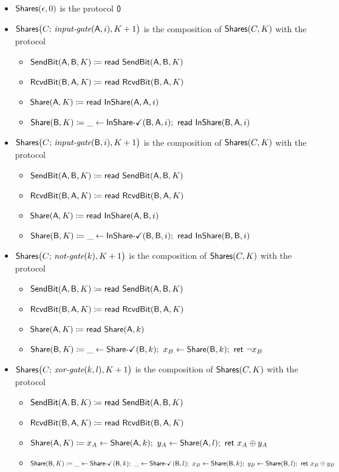 \begin{itemize}
\item $\Shares(\epsilon,0)$ is the protocol $\zero$

\item $\Shares\big(C; \, \inputgate(\A,i),K+1\big)$ is the composition of $\Shares(C,K)$ with the protocol
\begin{itemize}
\item $\SendBit(\A,\B,K) \coloneqq \read{\SendBit(\A,\B,K)}$
\item $\RcvdBit(\B,\A,K) \coloneqq \read{\RcvdBit(\B,\A,K)}$
\item $\Share(\A,K) \coloneqq \read{\InShare(\A,\A,i)}$
\item $\Share(\B,K) \coloneqq \_ \leftarrow \InShareOk(\B,\A,i); \ \read{\InShare(\B,\A,i)}$
\end{itemize}

\item $\Shares\big(C; \, \inputgate(\B,i),K+1\big)$ is the composition of $\Shares(C,K)$ with the protocol
\begin{itemize}
\item $\SendBit(\A,\B,K) \coloneqq \read{\SendBit(\A,\B,K)}$
\item $\RcvdBit(\B,\A,K) \coloneqq \read{\RcvdBit(\B,\A,K)}$
\item $\Share(\A,K) \coloneqq \read{\InShare(\A,\B,i)}$
\item $\Share(\B,K) \coloneqq \_ \leftarrow \InShareOk(\B,\B,i); \ \read{\InShare(\B,\B,i)}$
\end{itemize}

\item $\Shares\big(C; \, \notgate(k),K+1\big)$ is the composition of $\Shares(C,K)$ with the protocol
\begin{itemize}
\item $\SendBit(\A,\B,K) \coloneqq \read{\SendBit(\A,\B,K)}$
\item $\RcvdBit(\B,\A,K) \coloneqq \read{\RcvdBit(\B,\A,K)}$
\item $\Share(\A,K) \coloneqq \read{\Share(\A,k)}$
\item $\Share(\B,K) \coloneqq \_ \leftarrow \ShareOk(\B,k); \ x_B \leftarrow \Share(\B,k); \ \ret{\neg x_B}$
\end{itemize}

\item $\Shares\big(C; \, \xorgate(k,l),K+1\big)$ is the composition of $\Shares(C,K)$ with the protocol
\begin{itemize}
\item $\SendBit(\A,\B,K) \coloneqq \read{\SendBit(\A,\B,K)}$
\item $\RcvdBit(\B,\A,K) \coloneqq \read{\RcvdBit(\B,\A,K)}$
\item $\Share(\A,K) \coloneqq x_A \leftarrow \Share(\A,k); \ y_A \leftarrow \Share(\A,l); \ \ret{x_A \oplus y_A}$
\item $\Share(\B,K) \coloneqq \_ \leftarrow \ShareOk(\B,k); \ \_ \leftarrow \ShareOk(\B,l); \ x_B \leftarrow \Share(\B,k); \ y_B \leftarrow \Share(\B,l); \ \ret{x_B \oplus y_B}$
\end{itemize}


\end{itemize}
